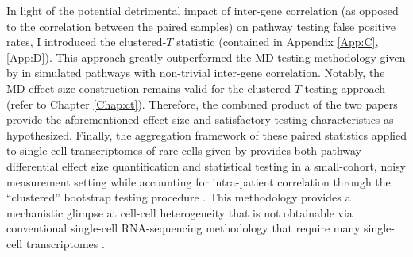 In light of the potential detrimental impact \citep{Tamayo2016} of inter-gene correlation (as opposed to the correlation between the paired samples) on pathway testing false positive rates, I introduced the clustered-$T$ statistic (contained in Appendix \ref{App:C}, \ref{App:D}). This approach greatly outperformed the MD testing methodology given by \citet{Schissler2015} in simulated pathways with non-trivial inter-gene correlation. Notably, the MD effect size construction remains valid for the clustered-$T$ testing approach (refer to Chapter \ref{Chap:ct}). Therefore, the combined product of the two papers provide the aforementioned effect size and satisfactory testing characteristics as hypothesized. Finally, the aggregation framework of these paired statistics applied to single-cell transcriptomes of rare cells given by \citet{Schissler2016} provides both pathway differential effect size quantification and statistical testing in a small-cohort, noisy measurement setting while accounting for intra-patient correlation through the ``clustered'' bootstrap testing procedure \citep{Schissler2016}. This methodology provides a mechanistic glimpse at cell-cell heterogeneity that is not obtainable via conventional single-cell RNA-sequencing methodology that require many single-cell transcriptomes \citep{Ding2015, Grun2014}.


